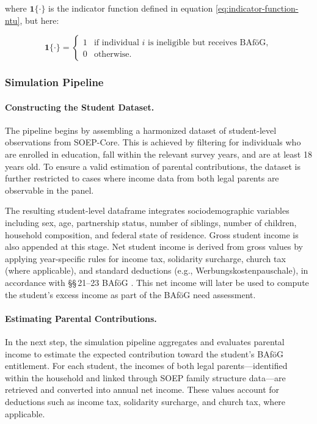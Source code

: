 where \( \mathbf{1}\{\cdot\} \) is the indicator function defined in equation \eqref{eq:indicator-function-ntu}, but here:

\[
\mathbf{1}\{\cdot\} =
\begin{cases}
1 & \text{if individual } i \text{ is ineligible but receives BAföG}, \\
0 & \text{otherwise}.
\end{cases}
\]

\subsubsection{Simulation Pipeline}

\paragraph{Constructing the Student Dataset.}
The pipeline begins by assembling a harmonized dataset of student-level observations from SOEP-Core. 
This is achieved by filtering for individuals who are enrolled in education, fall within the relevant survey years, and are at least 18 years old. 
To ensure a valid estimation of parental contributions, the dataset is further restricted to cases where income data from both legal parents are observable in the panel.

The resulting student-level dataframe integrates sociodemographic variables including sex, age, partnership status, number of siblings, number of children, household composition, and federal state of residence. 
Gross student income is also appended at this stage. 
Net student income is derived from gross values by applying year-specific rules for income tax, solidarity surcharge, church tax (where applicable), and standard deductions (e.g., Werbungskostenpauschale), in accordance with §§\,21–23 BAföG \citep{bafoeg_law}.
This net income will later be used to compute the student’s excess income as part of the BAföG need assessment.


\paragraph{Estimating Parental Contributions.}
In the next step, the simulation pipeline aggregates and evaluates parental income to estimate the expected contribution toward the student’s BAföG entitlement. 
For each student, the incomes of both legal parents—identified within the household and linked through SOEP family structure data—are retrieved and converted into annual net income. 
These values account for deductions such as income tax, solidarity surcharge, and church tax, where applicable.

